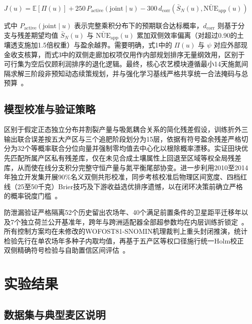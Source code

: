 \documentclass[11pt,a4paper]{article}
\begin{document}
\begin{equation}
J(u) = \mathbb{E}[\Pi(u)] + 250 \, P_{\text{active}}(\text{joint} \mid u) - 300 \, d_{\text{corr}}\!\left(\bar{S}_N(u), \bar{\text{NUE}}_{\text{app}}(u)\right)
\end{equation}

式中 $P_{\text{active}}(\text{joint} \mid u)$ 表示完整乘积分布下的预期联合达标概率，$d_{\text{corr}}$ 则基于分支与残差期望均值 $\bar{S}_N(u)$ 与 $\bar{\text{NUE}}_{\text{app}}(u)$ 累加双侧效率偏离（对超过0.90的土壤透支施加1.5倍权重）与盈余越界。需要明确，式1中的 $\Pi(u)$ 与 $\psi$ 对应外部现金收支核算，而式3中的双侧走廊加权项仅用作内部规划排序无量纲效用，区别于可行集为空后仅顾利润排序的退化逻辑。最终，核心农艺模块遵循最小14天施氮间隔求解三阶段非预知动态续策规划，并与强化学习基线严格共享统一合法掩码与总预算~\citep{ppo2017,mask2020}。

\subsection{模型校准与验证策略}

区别于假定正态独立分布并割裂产量与吸氮耦合关系的简化残差假设，训练折外三输出联合误差按五大产区与三个追肥阶段划分为15层，依据有符号盈余残差严格切分为32个等概率联合分位向量并强制零均值去中心化以根除概率漂移。实证田块优先匹配所属产区私有残差库，仅在未见合成土壤属性上回退至区域等权全局残差库，从而使在线分支积分完整守恒产量与氮平衡尾部协变。进一步利用2010至2014年独立开发集开展90\%名义双侧共形校准，同步考核校准后物理区间宽度、四档红线（25至50千克）Brier技巧及下游收益选优排序遗憾，以在闭环决策前确立严格的概率锐度门槛~\citep{fisher1981,geurts2006}。

防泄漏验证严格隔离52个历史留出农场年、40个满足前置条件的卫星距平迁移年以及7个独立荷兰公开基准年，跨年与跨洲适配器全部超参数均在内层训练折锁定~\citep{roberts2017,cawley2010}。所有控制方案均在未修改的WOFOST81-SNOMIN机理裁判上重头封闭推演，统计检验先行在单农场年多种子内取均值，再基于五产区等权口径施行统一Holm校正双侧精确符号检验与自助置信区间评估~\citep{holm1979,phipson2010}。

\FloatBarrier

\section{实验结果}

\subsection{数据集与典型麦区说明}
\end{document}
